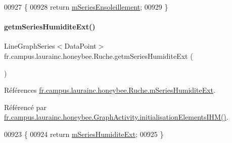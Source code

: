 \begin{DoxyCode}
00927                                                                  \{
00928         \textcolor{keywordflow}{return} \hyperlink{classfr_1_1campus_1_1laurainc_1_1honeybee_1_1_ruche_a46b1a74ed27674490aff13504ce39b5a}{mSeriesEnsoleillement};
00929     \}
\end{DoxyCode}
\mbox{\label{classfr_1_1campus_1_1laurainc_1_1honeybee_1_1_ruche_ad1868fa7a9c8f7840e224b06eb03dac9}} 
\paragraph{\texorpdfstring{getm\+Series\+Humidite\+Ext()}{getmSeriesHumiditeExt()}}
{\footnotesize\ttfamily Line\+Graph\+Series$<$Data\+Point$>$ fr.\+campus.\+laurainc.\+honeybee.\+Ruche.\+getm\+Series\+Humidite\+Ext (\begin{DoxyParamCaption}{ }\end{DoxyParamCaption})}



Références \hyperlink{classfr_1_1campus_1_1laurainc_1_1honeybee_1_1_ruche_abe6075db6a4cd92a43a0972514b4b552}{fr.\+campus.\+laurainc.\+honeybee.\+Ruche.\+m\+Series\+Humidite\+Ext}.



Référencé par \hyperlink{classfr_1_1campus_1_1laurainc_1_1honeybee_1_1_graph_activity_a7000895983725c6f795f7c73c1fafd20}{fr.\+campus.\+laurainc.\+honeybee.\+Graph\+Activity.\+initialisation\+Elements\+I\+H\+M()}.


\begin{DoxyCode}
00923                                                               \{
00924         \textcolor{keywordflow}{return} \hyperlink{classfr_1_1campus_1_1laurainc_1_1honeybee_1_1_ruche_abe6075db6a4cd92a43a0972514b4b552}{mSeriesHumiditeExt};
00925     \}
\end{DoxyCode}
\mbox{\label{classfr_1_1campus_1_1laurainc_1_1honeybee_1_1_ruche_a2b57090da3912989bbfcc04a76f9e651}} 
